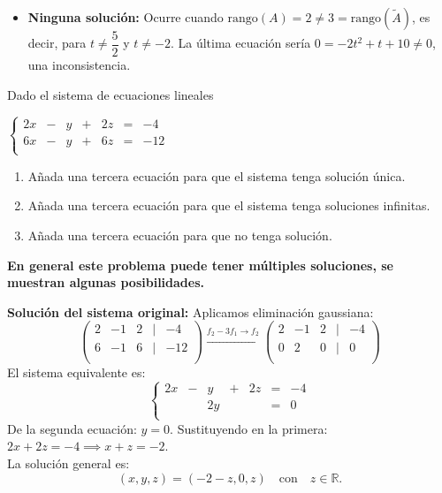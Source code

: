 \begin{prob}
\begin{myproof}
\begin{itemize}
\item \textbf{Ninguna solución:} Ocurre cuando \(\text{rango}(A) = 2 \neq 3 = \text{rango}(\tilde{A})\), es decir, para \(t \neq \dfrac{5}{2}\) y \(t \neq -2\). La última ecuación sería \(0 = -2t^2 + t + 10 \neq 0\), una inconsistencia.
\end{itemize}
\end{myproof}
\end{prob}

\begin{prob} 
Dado el sistema de ecuaciones lineales

$\left\lbrace \begin{array}{ccccccc}
2x&-&y&+&2z&=&-4\\
6x&-&y&+&6z&=&-12\\
\end{array} \right. $

\begin{enumerate}[$a)$]
\item Añada una tercera ecuación para que el sistema tenga solución única.
\item Añada una tercera ecuación para que el sistema tenga soluciones infinitas.
\item Añada una tercera ecuación para que no tenga solución.
\end{enumerate}

\begin{myproof} \textbf{En general este problema puede tener múltiples soluciones, se muestran algunas posibilidades.}

\textbf{Solución del sistema original:} Aplicamos eliminación gaussiana:
\[
\begin{pmatrix}
2 & -1 & 2 & | & -4 \\
6 & -1 & 6 & | & -12 \\
\end{pmatrix}
\xrightarrow{f_2 - 3f_1\to f_2}
\begin{pmatrix}
2 & -1 & 2 & | & -4 \\
0 & 2 & 0 & | & 0 \\
\end{pmatrix}
\]
El sistema equivalente es:
\[
\left\lbrace \begin{array}{rcrcrcl}
2x & - & y & + & 2z & = & -4 \\
& & 2y & & & = & 0 \\
\end{array} \right.
\]
De la segunda ecuación: $y = 0$. Sustituyendo en la primera:
$2x + 2z = -4 \implies x + z = -2$.\\
La solución general es:
\[
(x, y, z) = (-2 - z,  0,  z) \quad \text{con} \quad z \in \mathbb{R}.
\]


\end{myproof}
\end{prob}
